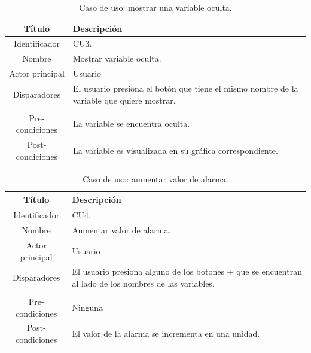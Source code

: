 \begin{table}[t]
	\centering
	\caption{Caso de uso: mostrar una variable oculta.}
	\centering
	\begin{tabular}{c p{}}    
		\toprule
		\textbf{Título }     & \textbf{Descripción} \\
		\midrule
		Identificador		&	CU3. \\
		Nombre				& 	Mostrar variable oculta. \\
		Actor principal		&   Usuario \\
		Disparadores		&   El usuario presiona el botón que tiene el mismo nombre de la variable que quiere mostrar. \\
\\
		Pre-condiciones		&   La variable se encuentra oculta. \\
		Post-condiciones	&   La variable es visualizada en su gráfica correspondiente.\\
		\bottomrule
	\end{tabular}
\label{tab:caso-mostrar}
\end{table}

\begin{table}[t]
	\centering
	\caption{Caso de uso: aumentar valor de alarma.}
	\centering
	\begin{tabular}{c p{}}    
		\toprule
		\textbf{Título }     & \textbf{Descripción} \\
		\midrule
		Identificador		&	CU4. \\
		Nombre				& 	Aumentar valor de alarma. \\
		Actor principal		&   Usuario \\
		Disparadores		&   El usuario presiona alguno de los botones + que se encuentran al lado de los nombres de las variables. \\
\\
		Pre-condiciones		&   Ninguna \\
		Post-condiciones	&   El valor de la alarma se incrementa en una unidad.\\
		\bottomrule
	\end{tabular}
\label{tab:caso-aumentar}
\end{table}

\makeatletter
\setlength{\@fptop}{5pt}
\makeatother


